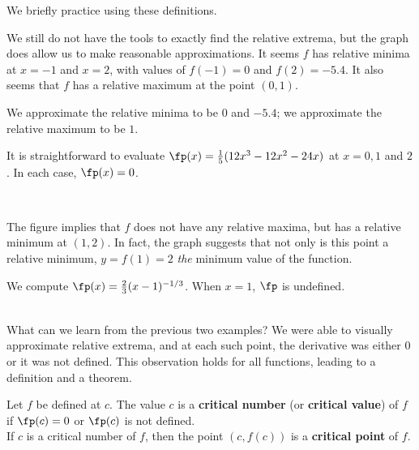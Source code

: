 \restoreboxwidth

We briefly practice using these definitions.\\

{We still do not have the tools to exactly find the relative extrema, but the graph does allow us to make reasonable approximations. It seems $f$ has relative minima at $x=-1$ and $x=2$, with values of $f(-1)=0$ and $f(2) = -5.4$. It also seems that $f$ has a relative maximum at the point $(0,1)$. 

We approximate the relative minima to be $0$ and $-5.4$; we approximate the relative maximum to be $1$.

It is straightforward to evaluate $\fp(x) =\frac15(12x^3-12x^2-24x)$ at $x=0, 1$ and $2$. In each case, $\fp(x) = 0$. 
}\\

{The figure implies that $f$ does not have any relative maxima, but has a relative minimum at $(1,2)$. In fact, the graph suggests that not only is this point a relative minimum, $y=f(1)=2$ \textit{the} minimum value of the function.

We compute $\fp(x) = \frac23(x-1)^{-1/3}$. When $x=1$, $\fp$ is undefined.}\\

What can we learn from the previous two examples? We were able to visually approximate relative extrema, and at each such point, the derivative was either 0 or it was not defined. This observation holds for all functions, leading to a definition and a theorem.

%
{Let $f$ be defined at $c$. The value $c$ is a \textbf{critical number} (or \textbf{critical value}) of $f$ if $\fp(c)=0$ or $\fp(c)$ is not defined. \\

If $c$ is a critical number of $f$, then the point $(c,f(c))$ is a \textbf{critical point} of $f$.}

